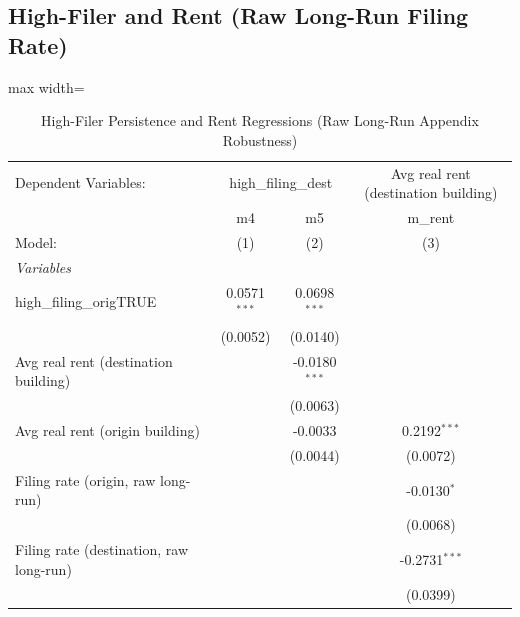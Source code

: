 \documentclass[
  11pt,
]{article}
\begin{document}
\subsection{High-Filer and Rent (Raw Long-Run Filing
Rate)}\label{high-filer-and-rent-raw-long-run-filing-rate}

\begin{table}[htbp]
\centering
\caption{\label{tab:evict_persist_hf_rent_raw} High-Filer Persistence and Rent Regressions (Raw Long-Run Appendix Robustness)}
\centering

\begin{adjustbox}{max width=\textwidth}
   \begin{tabular}{lccc}
      \tabularnewline \midrule \midrule
      Dependent Variables: & \multicolumn{2}{c}{high\_filing\_dest} & Avg real rent (destination building)\\
                                              & m4             & m5              & m\_rent \\    
      Model:                                  & (1)            & (2)             & (3)\\  
      \midrule
      \emph{Variables}\\
      high\_filing\_origTRUE                  & 0.0571$^{***}$ & 0.0698$^{***}$  &   \\   
                                              & (0.0052)       & (0.0140)        &   \\   
      Avg real rent (destination building)    &                & -0.0180$^{***}$ &   \\   
                                              &                & (0.0063)        &   \\   
      Avg real rent (origin building)         &                & -0.0033         & 0.2192$^{***}$\\   
                                              &                & (0.0044)        & (0.0072)\\   
      Filing rate (origin, raw long-run)      &                &                 & -0.0130$^{*}$\\   
                                              &                &                 & (0.0068)\\   
      Filing rate (destination, raw long-run) &                &                 & -0.2731$^{***}$\\   
                                              &                &                 & (0.0399)\\   

\end{tabular}
\end{adjustbox}
\end{table}
\end{document}
